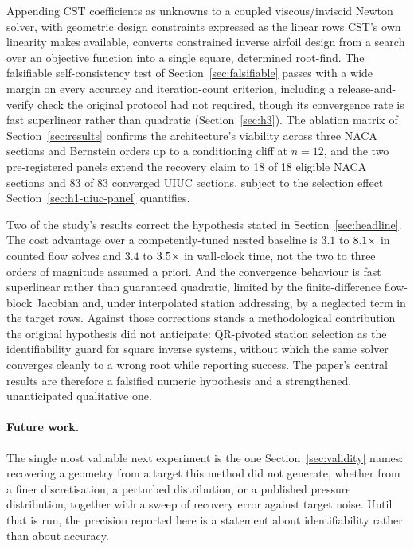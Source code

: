 Appending CST coefficients as unknowns to a coupled viscous/inviscid Newton
solver, with geometric design constraints expressed as the linear rows CST's
own linearity makes available, converts constrained inverse airfoil design
from a search over an objective function into a single square, determined
root-find. The falsifiable self-consistency test of
Section~\ref{sec:falsifiable} passes with a wide margin on every accuracy and
iteration-count criterion, including a release-and-verify check the original
protocol had not required, though its convergence rate is fast superlinear
rather than quadratic (Section~\ref{sec:h3}).
The ablation matrix of Section~\ref{sec:results} confirms the architecture's
viability across three NACA sections and Bernstein orders up to a conditioning
cliff at $n=12$, and the two pre-registered panels extend the recovery claim
to 18 of 18 eligible NACA sections and 83 of 83 converged UIUC sections,
subject to the selection effect Section~\ref{sec:h1-uiuc-panel} quantifies.

Two of the study's results correct the hypothesis stated in
Section~\ref{sec:headline}. The cost
advantage over a competently-tuned nested baseline is $3.1$ to $8.1\times$ in
counted flow solves and $3.4$ to $3.5\times$ in wall-clock time, not the two to three
orders of magnitude assumed a priori. And the convergence behaviour is fast
superlinear rather than guaranteed quadratic, limited by the
finite-difference flow-block Jacobian and, under interpolated station
addressing, by a neglected term in the target rows. Against those corrections
stands a methodological contribution the original hypothesis did not
anticipate: QR-pivoted station selection as the identifiability guard for
square inverse systems, without which the same solver converges cleanly to a
wrong root while reporting success. The paper's central results are therefore
a falsified numeric hypothesis and a strengthened, unanticipated qualitative
one.

\paragraph{Future work.} The single most valuable next experiment is the one
Section~\ref{sec:validity} names: recovering a geometry from a target this
method did not generate, whether from a finer discretisation, a perturbed
distribution, or a published pressure distribution, together with a sweep of
recovery error against target noise. Until that is run, the precision reported
here is a statement about identifiability rather than about accuracy.


